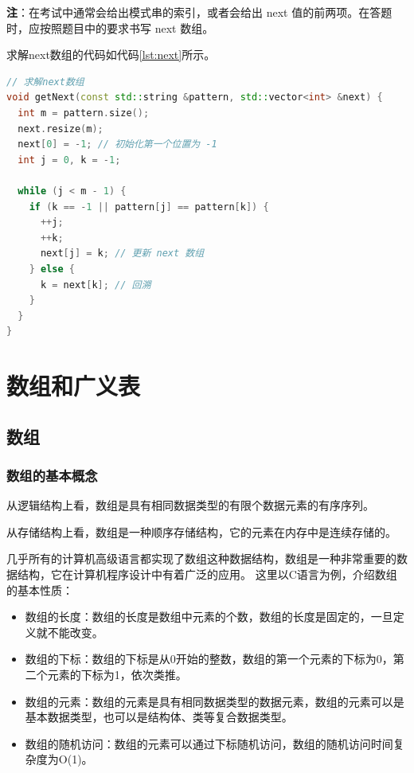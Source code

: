 \documentclass[lang=cn,newtx,10pt,scheme=chinese]{../elegantbook}
\begin{document}
\textbf{注}：在考试中通常会给出模式串的索引，或者会给出 next 值的前两项。在答题时，应按照题目中的要求书写 next 数组。


求解next数组的代码如代码\ref{lst:next}所示。

\begin{lstlisting}[language=C++, caption={求解next数组示例代码}, label={lst:next}]
  // 求解next数组
void getNext(const std::string &pattern, std::vector<int> &next) {
  int m = pattern.size();
  next.resize(m);
  next[0] = -1; // 初始化第一个位置为 -1
  int j = 0, k = -1;

  while (j < m - 1) {
    if (k == -1 || pattern[j] == pattern[k]) {
      ++j;
      ++k;
      next[j] = k; // 更新 next 数组
    } else {
      k = next[k]; // 回溯
    }
  }
}

\end{lstlisting}
\chapter{数组和广义表}

\section{数组}

\subsection{数组的基本概念}

从逻辑结构上看，数组是具有相同数据类型的有限个数据元素的有序序列。

从存储结构上看，数组是一种顺序存储结构，它的元素在内存中是连续存储的。

几乎所有的计算机高级语言都实现了数组这种数据结构，数组是一种非常重要的数据结构，它在计算机程序设计中有着广泛的应用。
这里以C语言为例，介绍数组的基本性质：

\begin{itemize}
  \item 数组的长度：数组的长度是数组中元素的个数，数组的长度是固定的，一旦定义就不能改变。
  \item 数组的下标：数组的下标是从0开始的整数，数组的第一个元素的下标为0，第二个元素的下标为1，依次类推。
  \item 数组的元素：数组的元素是具有相同数据类型的数据元素，数组的元素可以是基本数据类型，也可以是结构体、类等复合数据类型。
  \item 数组的随机访问：数组的元素可以通过下标随机访问，数组的随机访问时间复杂度为O(1)。
\end{itemize}
\end{document}
